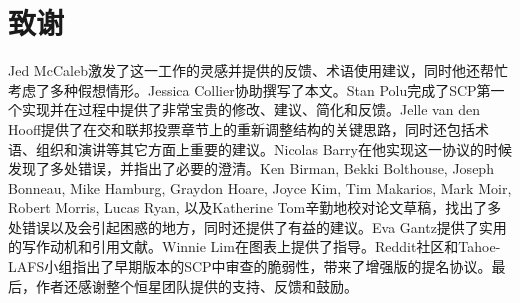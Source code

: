 \section{致谢}

Jed McCaleb激发了这一工作的灵感并提供的反馈、术语使用建议，同时他还帮忙考虑了多种假想情形。Jessica Collier协助撰写了本文。Stan Polu完成了SCP第一个实现并在过程中提供了非常宝贵的修改、建议、简化和反馈。Jelle van den Hooff提供了在{\quorum}交和联邦投票章节上的重新调整结构的关键思路，同时还包括术语、组织和演讲等其它方面上重要的建议。Nicolas Barry在他实现这一协议的时候发现了多处错误，并指出了必要的澄清。Ken Birman, Bekki Bolthouse, Joseph Bonneau, Mike Hamburg, Graydon Hoare, Joyce Kim, Tim Makarios, Mark Moir, Robert Morris, Lucas Ryan, 以及Katherine Tom辛勤地校对论文草稿，找出了多处错误以及会引起困惑的地方，同时还提供了有益的建议。Eva Gantz提供了实用的写作动机和引用文献。Winnie Lim在图表上提供了指导。Reddit社区和Tahoe-LAFS小组指出了早期版本的SCP中审查的脆弱性，带来了增强版的提名协议。最后，作者还感谢整个恒星团队提供的支持、反馈和鼓励。
